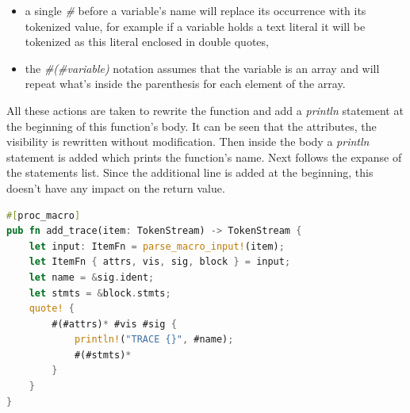 \begin{itemize}
    \item a single \textit{\#} before a variable's name will replace its occurrence with its tokenized value, for example if a variable holds a text literal it will be tokenized as this literal enclosed in double quotes,
    \item the \textit{\#(\#variable)\*} notation assumes that the variable is an array and will repeat what's inside the parenthesis for each element of the array.
\end{itemize}
All these actions are taken to rewrite the function and add a \textit{println} statement at the beginning of this function's body. It can be seen that the attributes, the visibility is rewritten without modification. Then inside the body a \textit{println} statement is added which prints the function's name. Next follows the expanse of the statements list. Since the additional line is added at the beginning, this doesn't have any impact on the return value.

\begin{minipage}{.9\textwidth}
    \begin{lstlisting}[language=rust,caption={A procedural macro exmaple},captionpos=b,label={proc_macro}]
#[proc_macro]
pub fn add_trace(item: TokenStream) -> TokenStream {
    let input: ItemFn = parse_macro_input!(item);
    let ItemFn { attrs, vis, sig, block } = input;
    let name = &sig.ident;
    let stmts = &block.stmts;
    quote! {
        #(#attrs)* #vis #sig {
            println!("TRACE {}", #name);
            #(#stmts)*
        }
    }
}
    \end{lstlisting}
\end{minipage}

